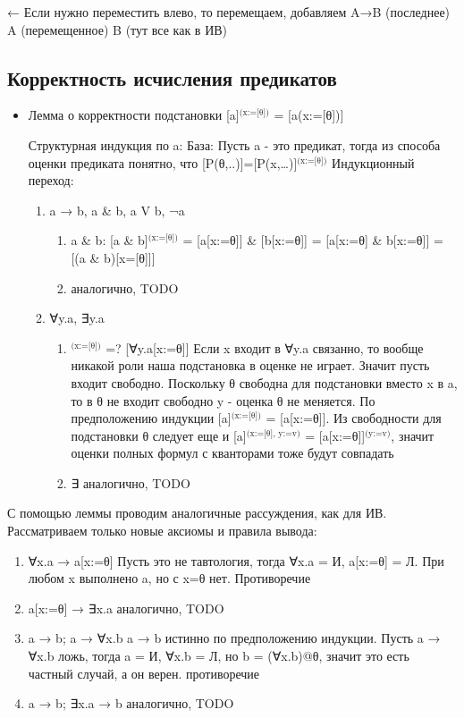 \documentclass[11pt]{article}
\begin{document}
← Если нужно переместить влево, то перемещаем, добавляем
A→B (последнее)
A    (перемещенное)
B
(тут все как в ИВ)
\subsection{Корректность исчисления предикатов}
\label{sec-7-3}
\begin{itemize}
\item Лемма о корректности подстановки
[a]$^{\text{(x:=[θ])}}$ = [a(x:=[θ])]

Структурная индукция по a:
База: Пусть a - это предикат, тогда из способа оценки предиката
понятно, что [P(θ,..)]=[P(x,\ldots{})]$^{\text{(x:=[θ])}}$
Индукционный переход:
\begin{enumerate}
\item a → b, a \& b, a V b, ¬a
\begin{enumerate}
\item a \& b:
[a \& b]$^{\text{(x:=[θ])}}$ = [a[x:=θ]] \& [b[x:=θ]] = [a[x:=θ] \& b[x:=θ]] =
[(a \& b)[x=[θ]]]
\item аналогично, TODO
\end{enumerate}
\item ∀y.a, ∃y.a
\begin{enumerate}
\item\relax [∀y.a]$^{\text{(x:=[θ])}}$ =? [∀y.a[x:=θ]]
Если x входит в ∀y.a связанно, то вообще никакой роли
наша подстановка в оценке не играет.
Значит пусть входит свободно.
Поскольку θ свободна для подстановки вместо x в a, то
в θ не входит свободно y - оценка θ не меняется.
По предположению индукции [a]$^{\text{(x:=[θ])}}$ = [a[x:=θ]].
Из свободности для подстановки θ следует еще и
[a]$^{\text{(x:=[θ], y:=v)}}$ = [a[x:=θ]]$^{\text{(y:=v)}}$, значит оценки полных
формул с кванторами тоже будут совпадать
\item ∃ аналогично, TODO
\end{enumerate}
\end{enumerate}
\end{itemize}

С помощью леммы проводим аналогичные рассуждения, как для ИВ.
Рассматриваем только новые аксиомы и правила вывода:
\begin{enumerate}
\item ∀x.a → a[x:=θ]
Пусть это не тавтология, тогда ∀x.a = И, a[x:=θ] = Л.
При любом x выполнено a, но с x=θ нет. Противоречие
\item a[x:=θ] → ∃x.a
аналогично, TODO
\item a → b; a → ∀x.b
a → b истинно по предположению индукции. Пусть a → ∀x.b ложь, тогда
a = И, ∀x.b = Л, но b = (∀x.b)@θ, значит это есть частный случай, а
он верен. противоречие
\item a → b; ∃x.a → b
аналогично, TODO
\end{enumerate}
\end{document}
